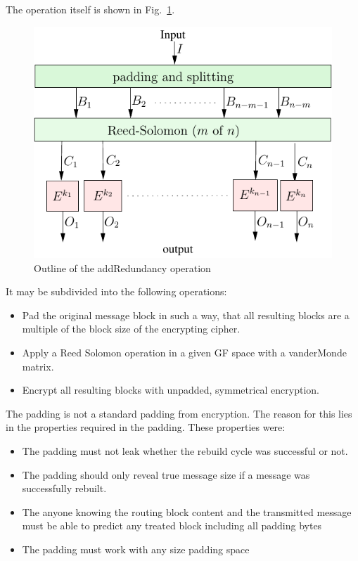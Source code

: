 \documentclass[10pt,journal,compsoc]{IEEEtran}
\let\MYoriglatexcaption\caption
\renewcommand{\caption}[2][\relax]{\MYoriglatexcaption[#2]{#2}}
\begin{document}
The operation itself is shown in Fig.~\ref{fig:addRedundancyOperation}. 
\begin{figure}[ht]\centering
	\includegraphics[width=0.8\columnwidth]{../../inc/addRedundancyOp}
	\caption{Outline of the addRedundancy operation}
	\label{fig:addRedundancyOperation}
\end{figure}
It may be subdivided into the following operations:
\begin{itemize}
	\item Pad the original message block in such a way, that all resulting blocks are a multiple of the block size of the encrypting cipher.
	\item Apply a Reed Solomon operation in a given GF space with a vanderMonde matrix.
	\item Encrypt all resulting blocks with unpadded, symmetrical encryption.
\end{itemize}

The padding is not a standard padding from encryption. The reason for this lies in the properties required in the padding. These properties were:
\begin{itemize}
	\item The padding must not leak whether the rebuild cycle was successful or not.
	\item The padding should only reveal true message size if a message was successfully rebuilt. 
	\item The anyone knowing the routing block content and the transmitted message must be able to predict any treated block including all padding bytes
	\item The padding must work with any size padding space
\end{itemize}
\end{document}
